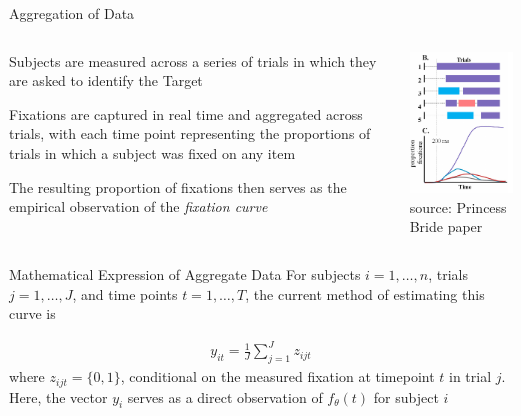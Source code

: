 \documentclass{beamer}
\begin{document}
\begin{frame}{Aggregation of Data}
\begin{columns}
\begin{column}{0.5\textwidth}
Subjects are measured across a series of trials in which they are asked to identify the Target \newline 

Fixations are captured in real time and aggregated across trials, with each time point representing the proportions of trials in which a subject was fixed on any item \newline 

The resulting proportion of fixations then serves as the empirical observation of the \textit{fixation curve}
\end{column}
\begin{column}{0.5\textwidth}  %
\begin{center}
\includegraphics[scale=0.5]{img/bob_aggregate.png}
\\
{\tiny source: Princess Bride paper}
\end{center}
\end{column}
\end{columns}
\end{frame}

\begin{frame}{Mathematical Expression of Aggregate Data}
For subjects $i = 1, \dots, n$, trials $j = 1, \dots, J$, and time points $t = 1, \dots, T$, the current method of estimating this curve is 

\begin{align*}
y_{it} = \frac{1}{J} \sum_{j=1}^J z_{ijt}
\end{align*}
where $z_{ijt} = \{0,1\}$, conditional on the measured fixation at timepoint $t$ in trial $j$. \newline \\

Here, the vector $y_i$ serves as a direct observation of $f_{\theta}(t)$ for subject $i$ 
\end{frame}
\end{document}
